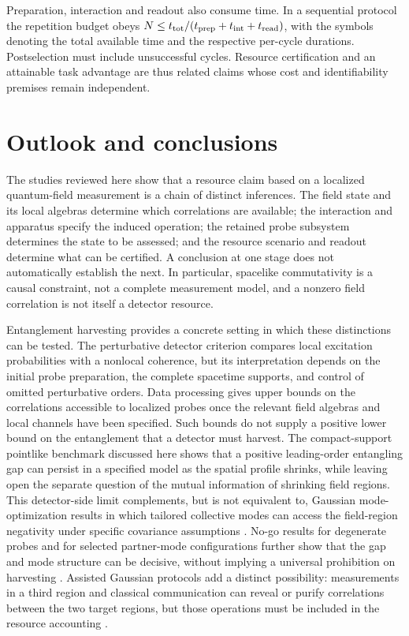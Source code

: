 \documentclass[pdflatex,sn-mathphys-num]{sn-jnl}
\begin{document}
Preparation, interaction and readout also consume time. In a sequential protocol the repetition budget obeys $N\leq t_{\rm tot}/(t_{\rm prep}+t_{\rm int}+t_{\rm read})$, with the symbols denoting the total available time and the respective per-cycle durations. Postselection must include unsuccessful cycles. Resource certification and an attainable task advantage are thus related claims whose cost and identifiability premises remain independent.

\section{Outlook and conclusions}
\label{sec:conclusion}

The studies reviewed here show that a resource claim based on a localized quantum-field measurement is a chain of distinct inferences. The field state and its local algebras determine which correlations are available; the interaction and apparatus specify the induced operation; the retained probe subsystem determines the state to be assessed; and the resource scenario and readout determine what can be certified. A conclusion at one stage does not automatically establish the next. In particular, spacelike commutativity is a causal constraint, not a complete measurement model, and a nonzero field correlation is not itself a detector resource.

Entanglement harvesting provides a concrete setting in which these distinctions can be tested. The perturbative detector criterion compares local excitation probabilities with a nonlocal coherence, but its interpretation depends on the initial probe preparation, the complete spacetime supports, and control of omitted perturbative orders. Data processing gives upper bounds on the correlations accessible to localized probes once the relevant field algebras and local channels have been specified. Such bounds do not supply a positive lower bound on the entanglement that a detector must harvest. The compact-support pointlike benchmark discussed here shows that a positive leading-order entangling gap can persist in a specified model as the spatial profile shrinks, while leaving open the separate question of the mutual information of shrinking field regions. This detector-side limit complements, but is not equivalent to, Gaussian mode-optimization results in which tailored collective modes can access the field-region negativity under specific covariance assumptions \cite{Torres2023,GaoKlco2025}. No-go results for degenerate probes and for selected partner-mode configurations further show that the gap and mode structure can be decisive, without implying a universal prohibition on harvesting \cite{PozasKerstjensLoukoMartinez2017,OsawaNambuYoshimoto2026}. Assisted Gaussian protocols add a distinct possibility: measurements in a third region and classical communication can reveal or purify correlations between the two target regions, but those operations must be included in the resource accounting \cite{GaoKlco2026Assistance}.
\end{document}
